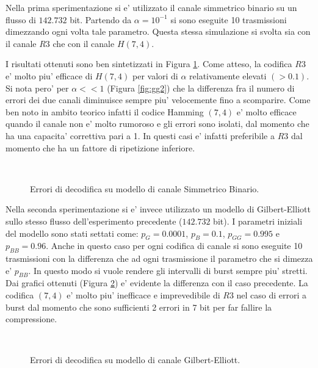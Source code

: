 \documentclass[a4paper,11pt]{article}
\theoremstyle{definition}
\begin{document}
Nella prima sperimentazione si e' utilizzato il canale simmetrico binario su un flusso di $142.732$ bit. Partendo da $\alpha=10^{-1}$ si sono eseguite 10 trasmissioni dimezzando ogni volta tale parametro. Questa stessa simulazione si svolta sia con il canale $R3$ che con il canale $H(7,4)$. 

I risultati ottenuti sono ben sintetizzati in Figura \ref{fig:mir1}. Come atteso, la codifica $R3$ e' molto piu' efficace di $H(7,4)$ per valori di $\alpha$ relativamente elevati $(>0.1)$. Si nota pero' per $\alpha<<1$ (Figura \ref{fig:gg2}) che la differenza fra il numero di errori dei due canali diminuisce sempre piu' velocemente fino a scomparire. Come ben noto in ambito teorico infatti il codice Hamming $(7,4)$ e' molto efficace quando il canale non e' molto rumoroso e gli errori sono isolati, dal momento che ha una capacita' correttiva pari a 1. In questi casi e' infatti preferibile a $R3$ dal momento che ha un fattore di ripetizione inferiore.

\begin{figure}
	\centering
	 \\
	\caption{Errori di decodifica su modello di canale Simmetrico Binario.}
	\label{fig:mir1}	
\end{figure}

Nella seconda sperimentazione si e' invece utilizzato un modello di Gilbert-Elliott sullo stesso flusso dell'esperimento precedente ($142.732$ bit). I parametri iniziali del modello sono stati settati come: $p_G=0.0001$, $p_B=0.1$, $p_{GG}=0.995$ e $p_{BB}=0.96$. Anche in questo caso per ogni codifica di canale si sono eseguite 10 trasmissioni con la differenza che ad ogni trasmissione il parametro che si dimezza e' $p_{BB}$. In questo modo si vuole rendere gli intervalli di burst sempre piu' stretti.
Dai grafici ottenuti (Figura \ref{fig:mir2}) e' evidente la differenza con il caso precedente. La codifica $(7,4)$ e' molto piu' inefficace e imprevedibile di $R3$ nel caso di errori a burst dal momento che sono sufficienti 2 errori in 7 bit per far fallire la compressione.

\begin{figure}
	\centering
	 \\
	\caption{Errori di decodifica su modello di canale Gilbert-Elliott.}
	\label{fig:mir2}	
\end{figure}
\end{document}
